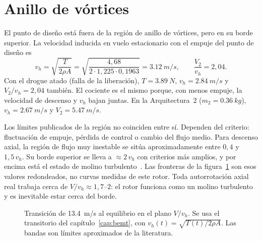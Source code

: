 \section{Anillo de vórtices}\label{sec:estabilidad-vrs}

El punto de diseño está fuera de la región de anillo de vórtices, pero en su borde
superior. La velocidad inducida en vuelo estacionario con el empuje del punto de diseño
es
\begin{equation}
  v_h=\sqrt{\frac{T}{2\rho A}}=\sqrt{\frac{4{,}68}{2\cdot1{,}225\cdot0{,}1963}}
  =\SI{3.12}{m/s},
  \qquad \frac{V_2}{v_h}=2{,}04 .
  \label{eq:estabilidad-vh}
\end{equation}
Con el drogue atado (falla de la liberación), $T=\SI{3.89}{N}$, $v_h=\SI{2.84}{m/s}$ y
$V_2/v_h=2{,}04$ también. El cociente es el mismo porque, con menos empuje, la velocidad de
descenso y $v_h$ bajan juntas. En la Arquitectura~2 ($m_2=\SI{0.36}{kg}$), $v_h=\SI{2.67}{m/s}$
y $V_2=\SI{5.47}{m/s}$.

Los límites publicados de la región no coinciden entre sí. Dependen del criterio:
fluctuación de empuje, pérdida de control o cambio del flujo medio. Para descenso axial,
la región de flujo muy inestable se sitúa aproximadamente entre $0{,}4$ y $1{,}5\,v_h$.
Su borde superior se lleva a $\approx2\,v_h$ con criterios más amplios, y por encima está
el estado de molino turbulento~\cite{leishman2006,johnson2005}. Las fronteras de la
figura~\ref{fig:estabilidad-vrs} son esos valores redondeados, no curvas medidas de este
rotor. Toda autorrotación axial real trabaja cerca de $V/v_h\approx1{,}7$--$2$: el rotor
funciona como un molino turbulento y es inevitable estar cerca del borde.

\begin{figure}[H]
\centering
{}
\caption{Transición de \SI{13.4}{m/s} al equilibrio en el plano $V/v_h$. Se usa el
transitorio del capítulo~\ref{cap:bemt}, con $v_h(t)=\sqrt{T(t)/2\rho A}$. Las bandas son
límites aproximados de la literatura.}
\label{fig:estabilidad-vrs}
\end{figure}

